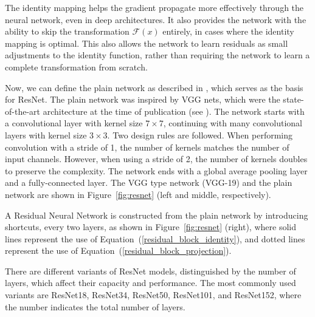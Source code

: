 The identity mapping helps the gradient propagate more effectively through the neural network, even in deep architectures. It also provides the network with the ability to skip the transformation $\mathcal{F}(x)$ entirely, in cases where the identity mapping is optimal. This also allows the network to learn residuals as small adjustments to the identity function, rather than requiring the network to learn a complete transformation from scratch.

Now, we can define the plain network as described in \cite{He2016}, which serves as the basis for ResNet. The plain network was inspired by VGG nets, which were the state-of-the-art architecture at the time of publication (see \cite{Simonyan2014}). The network starts with a convolutional layer with kernel size $7 \times 7$, continuing with many convolutional layers with kernel size $3 \times 3$. Two design rules are followed. When performing convolution with a stride of 1, the number of kernels matches the number of input channels. However, when using a stride of 2, the number of kernels doubles to preserve the complexity. The network ends with a global average pooling layer and a fully-connected layer. The VGG type network (VGG-19) and the plain network are shown in Figure~\ref{fig:resnet} (left and middle, respectively).

A Residual Neural Network is constructed from the plain network by introducing shortcuts, every two layers, as shown in Figure~\ref{fig:resnet} (right), where solid lines represent the use of Equation~(\ref{residual_block_identity}), and dotted lines represent the use of Equation~(\ref{residual_block_projection}).

There are different variants of ResNet models, distinguished by the number of layers, which affect their capacity and performance. The most commonly used variants are ResNet18, ResNet34, ResNet50, ResNet101, and ResNet152, where the number indicates the total number of layers.

